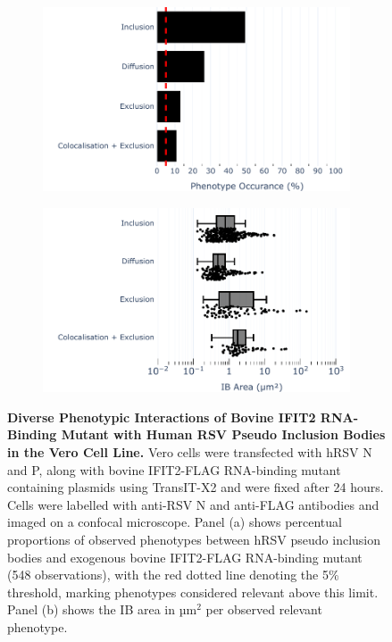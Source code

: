 \begin{figure}
    \begin{subfigure}{0.495\textwidth}
        \caption{}
        \includegraphics[width=1\linewidth]{09. Chapter 4/Figs/01. pIB/03. IFIT2/05. IFIT2-RNA binding mutant/02. pIB/01. bar_bi2f24_hnhp.pdf} 
    \end{subfigure}
    \begin{subfigure}{0.495\textwidth}
        \caption{}
        \includegraphics[width=1\linewidth]{09. Chapter 4/Figs/01. pIB/03. IFIT2/05. IFIT2-RNA binding mutant/02. pIB/02. box_bi2f24_hnhp.pdf}
    \end{subfigure}
    \caption[Diverse Phenotypic Interactions of Bovine IFIT2 RNA-Binding Mutant with Human RSV Pseudo Inclusion Bodies in the Vero Cell Line.]{\textbf{Diverse Phenotypic Interactions of Bovine IFIT2 RNA-Binding Mutant with Human RSV Pseudo Inclusion Bodies in the Vero Cell Line.} Vero cells were transfected with hRSV N and P, along with bovine IFIT2-FLAG RNA-binding mutant containing plasmids using TransIT-X2 and were fixed after 24 hours. Cells were labelled with anti-RSV N and anti-FLAG antibodies and imaged on a confocal microscope. Panel (a) shows percentual proportions of observed phenotypes between hRSV pseudo inclusion bodies and exogenous bovine IFIT2-FLAG RNA-binding mutant (548 observations), with the red dotted line denoting the 5\% threshold, marking phenotypes considered relevant above this limit. Panel (b) shows the IB area in \(\mbox{µm}^2\) per observed relevant phenotype.}
    \label{fig:Diverse Phenotypic Interactions of Bovine IFIT2 RNA-Binding Mutant with Human RSV Pseudo Inclusion Bodies in the Vero Cell Line}
\end{figure}

